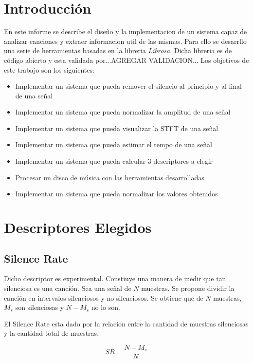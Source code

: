 \documentclass[]{article}
\begin{document}
\begin{multicols}{2}
\section{Introducción}
\label{sec: intro}
En este informe se describe el diseño y la implementacion de un sistema capaz de
analizar canciones y extraer informacion util de las mismas. Para ello se desarrllo
una serie de herramientas basadas en la libreria \textit{Librosa}. Dicha libreria
es de código abierto y esta validada por...AGREGAR VALIDACION...
\lipsum[2]
\lipsum[3]
Los objetivos de este trabajo son los siguientes:
\begin{itemize}
  \item Implementar un sistema que pueda remover el silencio al principio y al final de una señal
  \item Implementar un sistema que pueda normalizar la amplitud de una señal
  \item Implementar un sistema que pueda visualizar la STFT de una señal
  \item Implementar un sistema que pueda estimar el tempo de una señal
  \item Implementar un sistema que pueda calcular 3 descriptores a elegir
  \item Procesar un disco de música con las herramientas desarrolladas
  \item Implementar un sistema que pueda normalizar los valores obtenidos
\end{itemize}

\section{Descriptores Elegidos}

\subsection{Silence Rate}
Dicho descriptor es experimental. Constiuye una manera de medir que tan
silenciosa es una canción. Sea una señal de $N$ muestras. Se propone dividir la
canción en intervalos silenciosos y no silenciosos. Se obtiene que de $N$ muestras,
$M_s$ son silenciosas y $N-M_s$ no lo son.

El Silence Rate esta dado por la relacion entre la cantidad de muestras
silenciosas y la cantidad total de muestras:

\begin{equation}
  SR=\frac{N-M_s}{N}
\end{equation}


\end{multicols}
\end{document}
